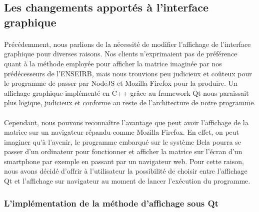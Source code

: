 \subsection{Les changements apportés à l'interface graphique}
\paragraph{}
Précédemment, nous parlions de la nécessité de modifier l'affichage de
l'interface graphique pour diverses raisons. Nos clients n'exprimaient
pas de préférence quant à la méthode employée pour afficher la matrice
imaginée par nos prédécesseurs de l'ENSEIRB, mais nous trouvions peu
judicieux et coûteux pour le programme de passer par NodeJS et Mozilla
Firefox pour la produire. Un affichage graphique implémenté en C++
grâce au framework Qt nous paraissait plus logique, judicieux et
conforme au reste de l'architecture de notre programme.
\paragraph{}
Cependant, nous pouvons reconnaître l'avantage que peut avoir
l'affichage de la matrice sur un navigateur répandu comme Mozilla
Firefox. En effet, on peut imaginer qu'à l'avenir, le programme
embarqué sur le système Bela pourra se passer d'un ordinateur pour
fonctionner et afficher la matrice sur l'écran d'un smartphone par
exemple en passant par un navigateur web. Pour cette raison, nous
avons décidé d'offrir à l'utilisateur la possibilité de choisir entre
l'affichage Qt et l'affichage sur navigateur au moment de lancer
l'exécution du programme.

\subsubsection{L'implémentation de la méthode d'affichage sous Qt}
